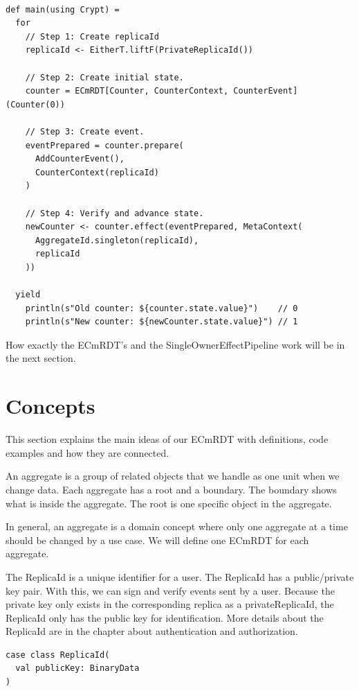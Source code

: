 \documentclass[
	ngerman,
	ruledheaders=section,   %
	class=report,		    %
	thesis={type=bachelor}, %
	accentcolor=9c,			%
	custommargins=true,    %
	marginpar=false,        %
	parskip=half-,          %
	fontsize=11pt,          %
]{tudapub}
\begin{document}
\begin{lstlisting}
    
def main(using Crypt) = 
  for
    // Step 1: Create replicaId
    replicaId <- EitherT.liftF(PrivateReplicaId())

    // Step 2: Create initial state.
    counter = ECmRDT[Counter, CounterContext, CounterEvent](Counter(0))

    // Step 3: Create event.
    eventPrepared = counter.prepare(
      AddCounterEvent(),
      CounterContext(replicaId)
    )

    // Step 4: Verify and advance state.
    newCounter <- counter.effect(eventPrepared, MetaContext(
      AggregateId.singleton(replicaId), 
      replicaId
    ))

  yield
    println(s"Old counter: ${counter.state.value}")    // 0
    println(s"New counter: ${newCounter.state.value}") // 1

\end{lstlisting}

How exactly the ECmRDT's and the SingleOwnerEffectPipeline work will be in the next section.

\section{Concepts}

This section explains the main ideas of our ECmRDT with definitions, code examples and how they are connected.


An aggregate is a group of related objects that we handle as one unit when we change data. Each aggregate has a root and a boundary. The boundary shows what is inside the aggregate. The root is one specific object in the aggregate. 

In general, an aggregate is a domain concept where only one aggregate at a time should be changed by a use case. We will define one ECmRDT for each aggregate.

The ReplicaId is a unique identifier for a user. The ReplicaId has a public/private key pair. With this, we can sign and verify events sent by a user. Because the private key only exists in the corresponding replica as a privateReplicaId, the ReplicaId only has the public key for identification. More details about the ReplicaId are in the chapter about authentication and authorization.

\begin{lstlisting}
case class ReplicaId(
  val publicKey: BinaryData
)
\end{lstlisting}
\end{document}
